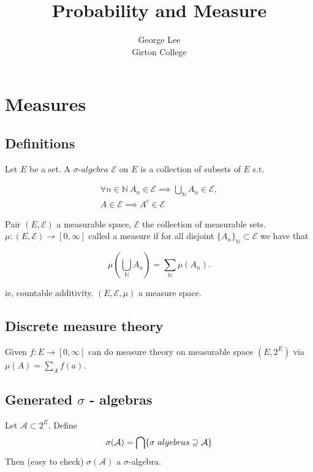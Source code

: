 \documentclass{article}
\title{Probability and Measure}
\author{George Lee\\Girton College}
\begin{document}
\maketitle
\section{Measures}

\subsection{Definitions}
Let $E$ be a set.  A $\sigma$-$algebra$ $\mathcal{E}$ on $E$ is a collection of subsets of $E$ s.t.

\begin{align*}
  \forall n \in \mathbb{N}~A_n \in \mathcal{E} \implies\bigcup_\mathbb{N}A_n \in \mathcal{E},
  \\
  A\in\mathcal{E}\implies A^c \in \mathcal{E}
\end{align*}

Pair $(E,\mathcal{E})$ a measurable space, $\mathcal{E}$ the collection of measurable sets.
\\
$\mu:(E,\mathcal{E})\rightarrow[0,\infty]$ called a measure if for all disjoint $\{A_n\}_\mathbb{N}\subset\mathcal{E}$ we have that

$$
  \mu(\bigcup_\mathbb{N}A_n)=\sum_\mathbb{N}\mu(A_n).
$$

ie, countable additivity.  $(E,\mathcal{E},\mu)$ a measure space.

\subsection{Discrete measure theory}
Given $f:E\rightarrow[0,\infty]$ can do measure theory on measurable space $(E,2^E)$ via $\mu(A)=\sum_Af(a)$.

\subsection{Generated $\sigma$ - algebras}
Let $\mathcal{A}\subset2^E$.  Define
$$
  \sigma(\mathcal{A})=\bigcap\{\sigma\-~ algebras\supseteq\mathcal{A}\}
$$
Then (easy to check) $\sigma(\mathcal{A})$ a $\sigma$-algebra.
\end{document}
